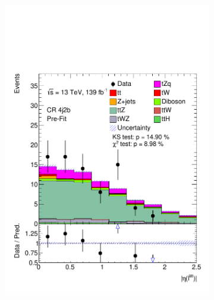 \begin{figure}[!h]
\begin{subfigure}[b]{0.33\linewidth}
    \includegraphics[width=\linewidth]{ubonn-thesis/Chapters/Chapters_06/Figure/Input_distribution/CR_4j2b_lepW_eta.pdf} 
  \end{subfigure}%
  \begin{subfigure}[b]{0.33\linewidth}
    \centering

\end{subfigure}
\end{figure}
